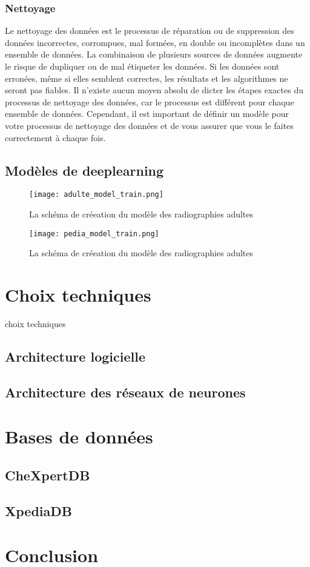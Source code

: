         \subsubsection{Nettoyage}
        Le nettoyage des données est le processus de réparation ou de suppression des données incorrectes, corrompues, mal formées, en double ou incomplètes dans un ensemble de données. La combinaison de plusieurs sources de données augmente le risque de dupliquer ou de mal étiqueter les données. Si les données sont erronées, même si elles semblent correctes, les résultats et les algorithmes ne seront pas fiables. Il n'existe aucun moyen absolu de dicter les étapes exactes du processus de nettoyage des données, car le processus est différent pour chaque ensemble de données. Cependant, il est important de définir un modèle pour votre processus de nettoyage des données et de vous assurer que vous le faites correctement à chaque fois.


   
    \subsection{Modèles de deeplearning}

    \begin{figure}[H]
        \centering
        \texttt{[image: adulte\_model\_train.png]}
        \caption{La schéma de créeation du modèle des radiographies adultes}\label{fig:adulte_model_schema}
    \end{figure}
    \begin{figure}[H]
        \centering
        \texttt{[image: pedia\_model\_train.png]}
        \caption{La schéma de créeation du modèle des radiographies adultes}\label{fig:pedia_model_schema}
    \end{figure}
\section{Choix techniques}
    choix techniques
    \subsection{Architecture logicielle}

    \subsection{Architecture des réseaux de neurones}

\section{Bases de données}
    \subsection{CheXpertDB}\label{chexpertDB}
    \subsection{XpediaDB}

\section*{Conclusion}